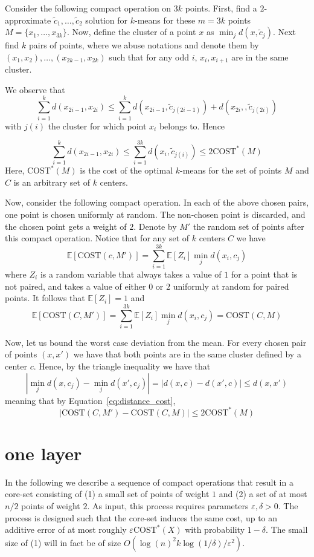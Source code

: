 \documentclass[11pt]{article}
\newcommand{\E}{{\mathbb{E}}}
\newcommand{\eps}{\varepsilon}
\newcommand{\cost}{\text{COST}}
\begin{document}
Consider the following compact operation on $3k$ points. First, find a $2$-approximate $\tilde{c}_1,\ldots,\tilde{c}_2$ solution for $k$-means for these $m=3k$ points $M=\{x_1,\ldots,x_{3k}\}$. Now, define the cluster of a point $x$ as $\min_j d(x,\tilde{c}_j)$. Next find $k$ pairs of points, where we abuse notations and denote them by $(x_1,x_2),\ldots,(x_{2k-1},x_{2k})$ such that for any odd $i$, $x_i,x_{i+1}$ are in the same cluster.

We observe that 
$$ \sum_{i=1}^k d(x_{2i-1},x_{2i}) \leq \sum_{i=1}^k d(x_{2i-1},\tilde{c}_{j(2i-1)}) + d(x_{2i},,\tilde{c}_{j(2i)}) $$
with $j(i)$ the cluster for which point $x_i$ belongs to. Hence

\begin{equation} \label{eq:distance_cost}
\sum_{i=1}^k d(x_{2i-1},x_{2i}) \leq \sum_{i=1}^{3k} d(x_{i},\tilde{c}_{j(i)}) \leq 2\cost^*(M) 
\end{equation}
Here, $\cost^*(M)$ is the cost of the optimal $k$-means for the set of points $M$ and $C$ is an arbitrary set of $k$ centers.

Now, consider the following compact operation. In each of the above chosen pairs, one point is chosen uniformly at random. The non-chosen point is discarded, and the chosen point gets a weight of $2$. Denote by $M'$ the random set of points after this compact operation. Notice that for any set of $k$ centers $C$ we have
$$ \E[\cost(c,M')] = \sum_{i=1}^{3k} \E[Z_i] \min_j d(x_i,c_j)$$
where $Z_i$ is a random variable that always takes a value of $1$ for a point that is not paired, and takes a value of either $0$ or $2$ uniformly at random for paired points. It follows that $\E[Z_i]=1$ and 
$$ \E[\cost(C,M')] = \sum_{i=1}^{3k} \E[Z_i] \min_j d(x_i,c_j) = \cost(C,M)$$

Now, let us bound the worst case deviation from the mean. For every chosen pair of points $(x,x')$ we have that both points are in the same cluster defined by a center $c$. Hence, by the triangle inequality we have that
$$ |\min_j d(x,c_j) - \min_j d(x',c_j)| =   | d(x,c) - d(x',c)| \leq d(x,x')$$
meaning that  by Equation~\eqref{eq:distance_cost},
$$ |\cost(C,M') - \cost(C,M)| \leq 2\cost^*(M)  $$

\section{one layer}
In the following we describe a sequence of compact operations that result in a core-set consisting of (1) a small set of points of weight $1$ and (2) a set of at most $n/2$ points of weight $2$. As input, this process requires parameters $\eps,\delta >0$. The process is designed such that the core-set induces the same cost, up to an additive error of at most roughly $\eps \cost^*(X)$ with probability $1-\delta$. The small size of (1) will in fact be of size  $O(\log(n)^2 k \log(1/\delta)/\eps^2)$.
\end{document}

